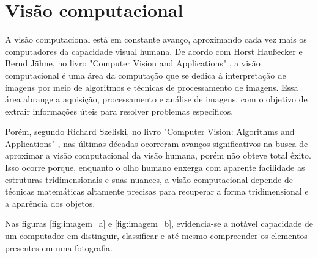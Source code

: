 \section{Visão computacional}
A visão computacional está em constante avanço, aproximando cada vez mais os computadores da capacidade visual humana. De acordo com Horst Haußecker e Bernd Jähne, no livro "Computer Vision and Applications" \cite{comp_vision_and_applications}, a visão computacional é uma área da computação que se dedica à interpretação de imagens por meio de algoritmos e técnicas de processamento de imagens. Essa área abrange a aquisição, processamento e análise de imagens, com o objetivo de extrair informações úteis para resolver problemas específicos.



Porém, segundo Richard Szeliski, no livro "Computer Vision: Algorithms and Applications" \cite{computer_vision_richard}, nas últimas décadas ocorreram avanços significativos na busca de aproximar a visão computacional da visão humana, porém não obteve total êxito. Isso ocorre porque, enquanto o olho humano enxerga com aparente facilidade as estruturas tridimensionais e suas nuances, a visão computacional depende de técnicas matemáticas altamente precisas para recuperar a forma tridimensional e a aparência dos objetos.

Nas figuras \cref{fig:imagem_a} e \cref{fig:imagem_b}, evidencia-se a notável capacidade de um computador em distinguir, classificar e até mesmo compreender os elementos presentes em uma fotografia.



